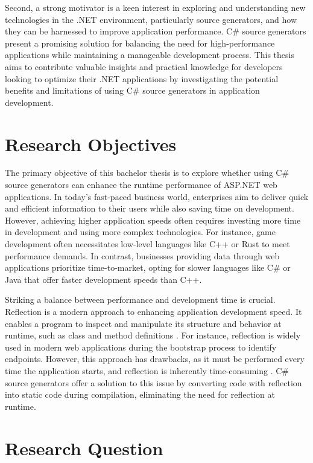 Second, a strong motivator is a keen interest in exploring and understanding new technologies in the .NET environment, particularly source generators, and how they can be harnessed to improve application performance. C\# source generators present a promising solution for balancing the need for high-performance applications while maintaining a manageable development process. This thesis aims to contribute valuable insights and practical knowledge for developers looking to optimize their .NET applications by investigating the potential benefits and limitations of using C\# source generators in application development.

\section{Research Objectives}

The primary objective of this bachelor thesis is to explore whether using C\# source generators can enhance the runtime performance of ASP.NET web applications. In today's fast-paced business world, enterprises aim to deliver quick and efficient information to their users while also saving time on development. However, achieving higher application speeds often requires investing more time in development and using more complex technologies. For instance, game development often necessitates low-level languages like C++ or Rust to meet performance demands. In contrast, businesses providing data through web applications prioritize time-to-market, opting for slower languages like C\# or Java that offer faster development speeds than C++.

Striking a balance between performance and development time is crucial. Reflection is a modern approach to enhancing application development speed. It enables a program to inspect and manipulate its structure and behavior at runtime, such as class and method definitions \cite{Draheim2005GenerativeC}. For instance, reflection is widely used in modern web applications during the bootstrap process to identify endpoints. However, this approach has drawbacks, as it must be performed every time the application starts, and reflection is inherently time-consuming \cite{Dragan2005PerformanceComputing}. C\# source generators offer a solution to this issue by converting code with reflection into static code during compilation, eliminating the need for reflection at runtime.

\section{Research Question}

